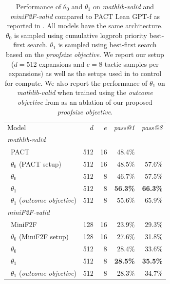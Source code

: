 \documentclass[nohyperref]{article}
\theoremstyle{plain}
\theoremstyle{definition}
\theoremstyle{remark}
\begin{document}
\begin{table}[t]
\caption{Performance of $\theta_0$ and $\theta_1$ on \textit{mathlib-valid} and \textit{miniF2F-valid} compared to PACT Lean GPT-f as reported in \citet{han2021proof,zheng2021minif2f}. All models have the same architecture. $\theta_0$ is sampled using cumulative logprob priority best-first search. $\theta_1$ is sampled using best-first search based on the \textit{proofsize objective}. We report our setup ($d=512$ expansions and $e=8$ tactic samples per expansions) as well as the setups used in \citet{han2021proof,zheng2021minif2f} to control for compute. We also report the performance of $\theta_1$ on \textit{mathlib-valid} when trained using the \textit{outcome objective} from \citet{polu2020generative} as an ablation of our proposed \textit{proofsize objective}.}
\label{fig:bootstrap-eval}
\begin{center}
\begin{small}
\begin{tabular}{lrrrr}
\toprule
Model & $d$ & $e$ & \textit{pass@1} & \textit{pass@8} \\
\cmidrule(r){1-5}
\multicolumn{5}{l}{\textit{mathlib-valid}} \\
~PACT & 512 & 16 & 48.4\% & \\
~$\theta_0$ (PACT setup) & 512 & 16 & 48.5\% & 57.6\% \\
~$\theta_0$ & 512 & 8 & 46.7\% & 57.5\% \\
~$\theta_1$ & 512 & 8 & {\bf 56.3\%} & {\bf 66.3\%} \\  
~$\theta_1$ (\textit{outcome objective}) & 512 & 8 & 55.6\% & 65.9\% \\  
\cmidrule(r){1-5}
\multicolumn{5}{l}{\textit{miniF2F-valid}} \\
~MiniF2F & 128 & 16 & 23.9\% & 29.3\% \\
~$\theta_0$ (MiniF2F setup) & 128 & 16 & 27.6\% & 31.8\% \\
~$\theta_0$ & 512 & 8 & 28.4\% & 33.6\% \\
~$\theta_1$ & 512 & 8 & {\bf 28.5\%} & {\bf 35.5\%} \\  
~$\theta_1$ (\textit{outcome objective}) & 512 & 8 & 28.3\% & 34.7\% \\
\bottomrule
\end{tabular}
\end{small}
\end{center}
\end{table}
\end{document}
